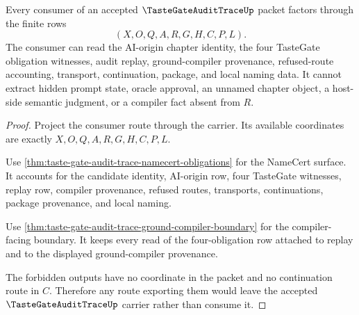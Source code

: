 \begin{theorem}
\label{thm:taste-gate-audit-trace-non-escape}
Every consumer of an accepted $\TasteGateAuditTraceUp$ packet factors through the finite rows
$$
(X,O,Q,A,R,G,H,C,P,L).
$$
The consumer can read the AI-origin chapter identity, the four TasteGate obligation witnesses, audit replay, ground-compiler provenance, refused-route accounting, transport, continuation, package, and local naming data. It cannot extract hidden prompt state, oracle approval, an unnamed chapter object, a host-side semantic judgment, or a compiler fact absent from $R$.
\end{theorem}
\begin{proof}
Project the consumer route through the carrier. Its available coordinates are exactly $X,O,Q,A,R,G,H,C,P,L$.

Use \autoref{thm:taste-gate-audit-trace-namecert-obligations} for the NameCert surface. It accounts for the candidate identity, AI-origin row, four TasteGate witnesses, replay row, compiler provenance, refused routes, transports, continuations, package provenance, and local naming.

Use \autoref{thm:taste-gate-audit-trace-ground-compiler-boundary} for the compiler-facing boundary. It keeps every read of the four-obligation row attached to replay and to the displayed ground-compiler provenance.

The forbidden outputs have no coordinate in the packet and no continuation route in $C$. Therefore any route exporting them would leave the accepted $\TasteGateAuditTraceUp$ carrier rather than consume it.
\end{proof}


\begin{closurestatus}{\TasteGateAuditTraceUp}
  \theoryclosure{\seedClosure}
  \formalstatus{\unformalizedV}
\end{closurestatus}
